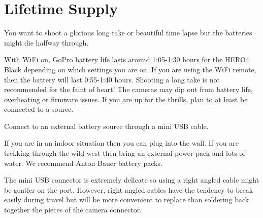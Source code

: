 \section{Lifetime Supply}
\pagecolor{white}
\label{chap:8}
\begin{fullwidth}

\problem

{\large You want to shoot a glorious long take or beautiful time lapse but the batteries might die halfway through. \par}

With WiFi on, GoPro battery life lasts around 1:05-1:30 hours for the HERO4 Black depending on which settings you are on. If you are using the WiFi remote, then the battery will last 0:55-1:40 hours. Shooting a long take is not recommended for the faint of heart! The cameras may dip out from battery life, overheating or firmware issues. If you are up for the thrills, plan to at least be connected to a source. 


\solution

{\large Connect to an external battery source through a mini USB cable. \par}

If you are in an indoor situation then you can plug into the wall. If you are trekking through the wild west then bring an external power pack and lots of water. We recommend Anton Bauer battery packs.


\tip The mini USB connector is extremely delicate so using a right angled cable might be gentler on the port. However, right angled cables have the tendency to break easily during travel but will be more convenient to replace than soldering back together the pieces of the camera connector. 





\clearpage
\end{fullwidth}
